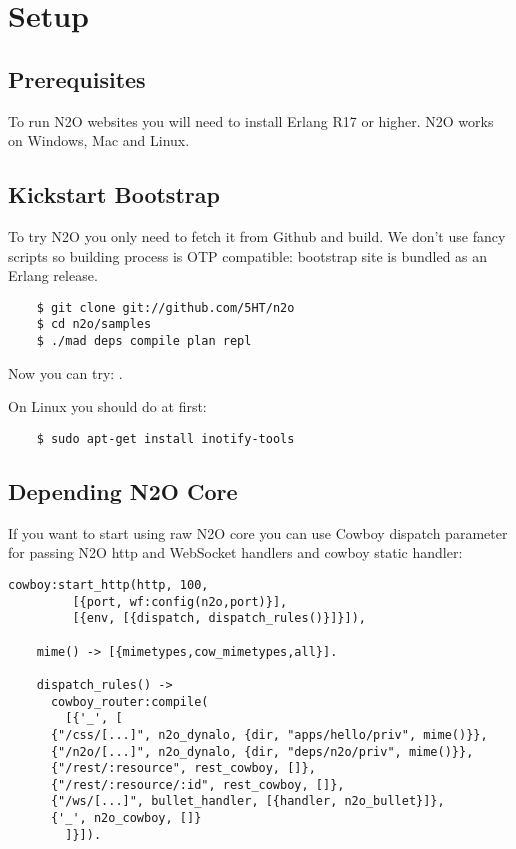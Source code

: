 \section{Setup}

\subsection{Prerequisites}
To run N2O websites you will need to install Erlang R17 or higher.
N2O works on Windows, Mac and Linux.

\subsection{Kickstart Bootstrap}
To try N2O you only need to fetch it from Github and build. We don't use
fancy scripts so building process is OTP compatible: bootstrap site
is bundled as an Erlang release.

\vspace{1\baselineskip}
\begin{lstlisting}
    $ git clone git://github.com/5HT/n2o
    $ cd n2o/samples
    $ ./mad deps compile plan repl
\end{lstlisting}
\vspace{1\baselineskip}

Now you can try: .

On Linux you should do at first:

\begin{lstlisting}
    $ sudo apt-get install inotify-tools
\end{lstlisting}

\newpage
\subsection{Depending N2O Core}
If you want to start using raw N2O core you can use Cowboy dispatch parameter
for passing N2O http and WebSocket handlers and cowboy static handler:

\begin{lstlisting}[caption=web\_sup.erl]
    cowboy:start_http(http, 100, 
         [{port, wf:config(n2o,port)}],
         [{env, [{dispatch, dispatch_rules()}]}]),

    mime() -> [{mimetypes,cow_mimetypes,all}].

    dispatch_rules() ->
      cowboy_router:compile(
        [{'_', [
      {"/css/[...]", n2o_dynalo, {dir, "apps/hello/priv", mime()}},
      {"/n2o/[...]", n2o_dynalo, {dir, "deps/n2o/priv", mime()}},
      {"/rest/:resource", rest_cowboy, []},
      {"/rest/:resource/:id", rest_cowboy, []},
      {"/ws/[...]", bullet_handler, [{handler, n2o_bullet}]},
      {'_', n2o_cowboy, []}
        ]}]).
\end{lstlisting}
\vspace{1\baselineskip}


